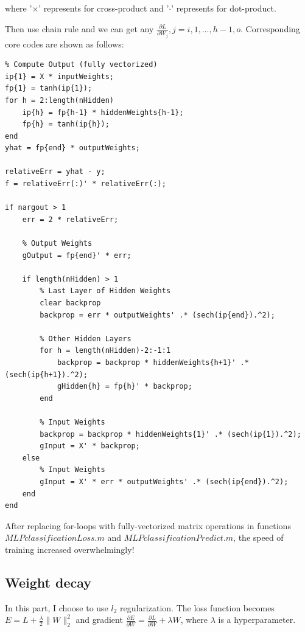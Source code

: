 \documentclass{article}
\begin{document}
where '$\times$' represents for cross-product and '$\cdot$' represents for dot-product.

Then use chain rule and we can get any $\frac{\partial{L}}{\partial{W_j}},j=i,1,\dots,h-1,o$. Corresponding core codes are shown as follows:

\begin{lstlisting}
% Compute Output (fully vectorized)
ip{1} = X * inputWeights;
fp{1} = tanh(ip{1});
for h = 2:length(nHidden)
    ip{h} = fp{h-1} * hiddenWeights{h-1};
    fp{h} = tanh(ip{h});
end
yhat = fp{end} * outputWeights;

relativeErr = yhat - y;
f = relativeErr(:)' * relativeErr(:);

if nargout > 1
    err = 2 * relativeErr;
    
    % Output Weights
    gOutput = fp{end}' * err;
    
    if length(nHidden) > 1
        % Last Layer of Hidden Weights
        clear backprop
        backprop = err * outputWeights' .* (sech(ip{end}).^2);
        
        % Other Hidden Layers
        for h = length(nHidden)-2:-1:1
            backprop = backprop * hiddenWeights{h+1}' .* (sech(ip{h+1}).^2);
            gHidden{h} = fp{h}' * backprop;
        end
        
        % Input Weights
        backprop = backprop * hiddenWeights{1}' .* (sech(ip{1}).^2);
        gInput = X' * backprop;
    else
        % Input Weights
        gInput = X' * err * outputWeights' .* (sech(ip{end}).^2);
    end
end
\end{lstlisting}
 
After replacing for-loops with fully-vectorized matrix operations in functions $MLPclassificationLoss.m$ and $MLPclassificationPredict.m$, the speed of training increased overwhelmingly!
 
\subsection{Weight decay}

In this part, I choose to use $l_2$ regularization. The loss function becomes $E=L+\frac{\lambda}{2}\|W\|_2^2$ and gradient $\frac{\partial E}{\partial W}=\frac{\partial L}{\partial W}+\lambda W$, where $\lambda$ is a hyperparameter.\par
\end{document}
